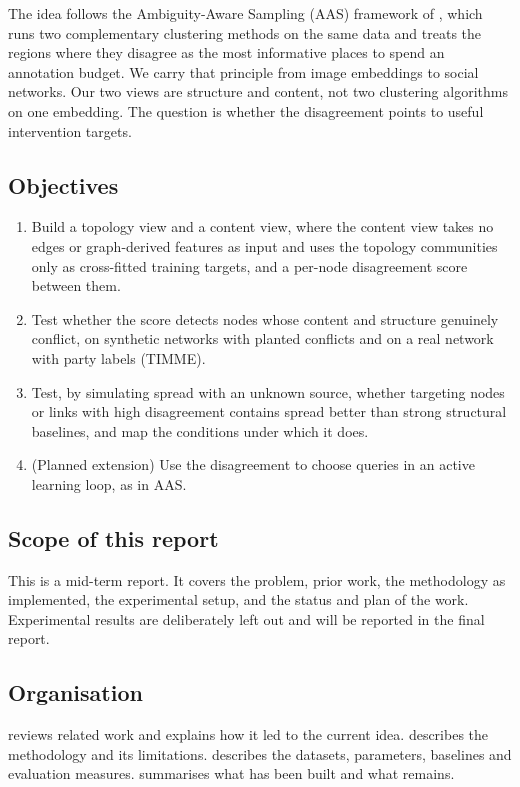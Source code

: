 The idea follows the Ambiguity-Aware Sampling (AAS) framework of
\citet{sani2026aas}, which runs two complementary clustering methods on the same data
and treats the regions where they disagree as the most informative places to spend
an annotation budget. We carry that principle from image embeddings to social
networks. Our two views are structure and content, not two clustering algorithms on
one embedding. The question is whether the disagreement points to useful intervention
targets.

\subsection{Objectives}
\begin{enumerate}
  \item Build a topology view and a content view, where the content view takes no
        edges or graph-derived features as input and uses the topology communities
        only as cross-fitted training targets, and a per-node disagreement score
        between them.
  \item Test whether the score detects nodes whose content and structure genuinely
        conflict, on synthetic networks with planted conflicts and on a real network
        with party labels (TIMME).
  \item Test, by simulating spread with an unknown source, whether targeting nodes
        or links with high disagreement contains spread better than strong
        structural baselines, and map the conditions under which it does.
  \item (Planned extension) Use the disagreement to choose queries in an active
        learning loop, as in AAS.
\end{enumerate}

\subsection{Scope of this report}
This is a mid-term report. It covers the problem, prior work, the methodology as
implemented, the experimental setup, and the status and plan of the work.
Experimental results are deliberately left out and will be reported in the final
report.

\subsection{Organisation}
 reviews related work and explains how it led to the current idea.
 describes the methodology and its limitations. 
describes the datasets, parameters, baselines and evaluation measures.
 summarises what has been built and what remains.
